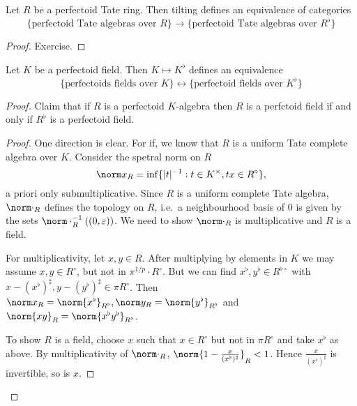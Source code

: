 \documentclass[a4paper]{article}
\newcommand{\tilt}{\flat} %
\begin{document}
\begin{theorem}
  Let \(R\) be a perfectoid Tate ring. Then tilting defines an equivalence of categories
  \[
    \{\text{perfectoid Tate algebras over } R\}
    \to
    \{\text{perfectoid Tate algebras over } R^\tilt\}
  \]
\end{theorem}

\begin{proof}
  Exercise.
\end{proof}

\begin{theorem}
  Let \(K\) be a perfectoid field. Then \(K \mapsto K^\tilt\) defines an equivalence
  \[
    \{\text{perfectoids fields over } K\}
    \longleftrightarrow
    \{\text{perfectoid fields over } K^\tilt\}
  \]
\end{theorem}

\begin{proof}
  Claim that if \(R\) is a perfectoid \(K\)-algebra then \(R\) is a perfctoid field if and only if \(R^\tilt\) is a perfectoid field.

  \begin{proof}
    One direction is clear. For if, we know that \(R\) is a uniform Tate complete algebra over \(K\). Consider the spetral norm on \(R\)
    \[
      \norm x_R = \inf \{|t|^{-1}: t \in K^\times, tx \in R^\circ\},
    \]
    a priori only submultiplicative. Since \(R\) is a uniform complete Tate algebra, \(\norm \cdot_R\) defines the topology on \(R\), i.e.\ a neighbourhood basis of \(0\) is given by the sets \(\norm \cdot_R^{-1}((0, \varepsilon))\). We need to show \(\norm \cdot_R\) is multiplicative and \(R\) is a field.

    For multiplicativity, let \(x, y \in R\). After multiplying by elements in \(K\) we may assume \(x, y \in R^\circ\), but not in \(\pi^{1/p} \cdot R^\circ\). But we can find \(x^\tilt, y^\tilt \in R^{\tilt \circ}\) with \(x - (x^\tilt)^\sharp, y - (y^\tilt)^\sharp \in \pi R^\circ\). Then \(\norm x_R = \norm{x^\tilt}_{R^\tilt}, \norm y_R = \norm{y^\tilt}_{R^\tilt}\) and \(\norm{xy}_R = \norm{x^\tilt y^\tilt}_{R^\tilt}\).

    To show \(R\) is a field, choose \(x\) such that \(x \in R^\circ\) but not in \(\pi R^\circ\) and take \(x^\tilt\) as above. By multiplicativity of \(\norm \cdot_R\), \(\norm{1 - \frac{x}{(x^\tilt)^\sharp}}_R < 1\). Hence \(\frac{x}{(x^\tilt)^\sharp}\) is invertible, so is \(x\).
  \end{proof}
\end{proof}
\end{document}
